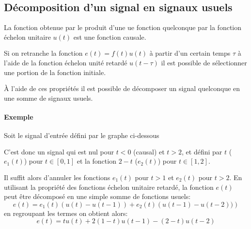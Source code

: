 \subsection{Décomposition d'un signal en signaux usuels}
La fonction obtenue par le produit d'une ue fonction quelconque 
par la fonction échelon unitaire $u(t)$ est une fonction causale.
\begin{center}
    
\end{center}
Si on retranche la fonction $e(t)=f(t)u(t)$ à partir d'un certain temps
$\tau$ à l'aide de la fonction échelon unité retardé $u(t-\tau)$ 
il est possible de sélectionner une portion de la fonction initiale.
\begin{center}
    
\end{center}
\`A l'aide de ces propriétés il est possible de décomposer un signal 
quelconque en une somme de signaux usuels.
\paragraph{Exemple}
Soit le signal d'entrée défini par le graphe ci-dessous
\begin{center}
    
\end{center}
C'est donc un signal qui est nul pour $t<0$ (causal) et $t>2$, et défini
par $t$ ($e_1(t)$) pour $t\in[0,1]$ et la fonction $2-t$ ($e_2(t)$) pour 
$t\in[1,2]$. 

Il suffit alors d'annuler les fonctions $e_1(t)$ pour $t>1$ et 
$e_2(t)$ pour $t>2$.
En utilisant la propriété des fonctions échelon unitaire retardé, la fonction 
$e(t)$ peut être décomposé en une simple somme de fonctions usuels:
\[
    e(t)=e_1(t)\left(u(t)-u(t-1)\right) + e_2(t)\left(u(t-1)-u(t-2))\right)
\]
en regroupant les termes on obtient alors:
\[
    e(t)=tu(t)+2(1-t)u(t-1)-(2-t)u(t-2)
\]
\newpage
{}
\captionsetup{width=0.9\linewidth}
